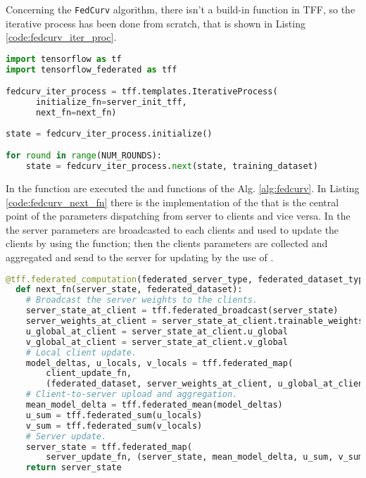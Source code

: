 Concerning the \texttt{FedCurv} algorithm, there isn't a build-in function in TFF, so the iterative process has been done from scratch, that is shown in Listing \ref{code:fedcurv_iter_proc}.


\begin{lstlisting}[caption={Example code of the TFF iterative process for \texttt{FedCurv}.},label={code:fedcurv_iter_proc},language=Python]
import tensorflow as tf
import tensorflow_federated as tff

fedcurv_iter_process = tff.templates.IterativeProcess(
      initialize_fn=server_init_tff,
      next_fn=next_fn)
      
state = fedcurv_iter_process.initialize()

for round in range(NUM_ROUNDS):
    state = fedcurv_iter_process.next(state, training_dataset)
\end{lstlisting}


In the  function are executed the  and  functions of the Alg. \ref{alg:fedcurv}. In Listing \ref{code:fedcurv_next_fn} there is the implementation of the  that is the central point of the parameters dispatching from server to clients and vice versa. In the  the server parameters are broadcasted to each clients and used to update the clients by using the  function; then the clients parameters are collected and aggregated and send to the server for updating by the use of . \\


\begin{lstlisting}[caption={TFF implementation of the next\_fn of \texttt{FedCurv}.},label={code:fedcurv_next_fn},language=Python]
@tff.federated_computation(federated_server_type, federated_dataset_type)
  def next_fn(server_state, federated_dataset):
    # Broadcast the server weights to the clients.
    server_state_at_client = tff.federated_broadcast(server_state)
    server_weights_at_client = server_state_at_client.trainable_weights
    u_global_at_client = server_state_at_client.u_global
    v_global_at_client = server_state_at_client.v_global
    # Local client update.
    model_deltas, u_locals, v_locals = tff.federated_map(
        client_update_fn, 
        (federated_dataset, server_weights_at_client, u_global_at_client, v_global_at_client))
    # Client-to-server upload and aggregation.
    mean_model_delta = tff.federated_mean(model_deltas)
    u_sum = tff.federated_sum(u_locals)
    v_sum = tff.federated_sum(v_locals)
    # Server update.
    server_state = tff.federated_map(
        server_update_fn, (server_state, mean_model_delta, u_sum, v_sum))
    return server_state
\end{lstlisting}

